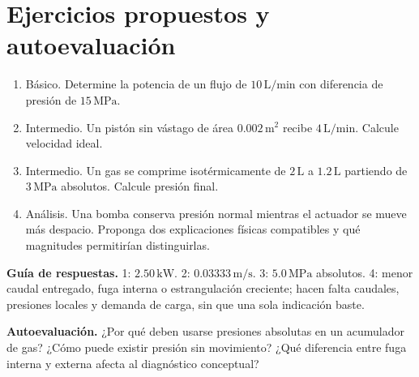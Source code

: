 \section{Ejercicios propuestos y autoevaluación}
\begin{enumerate}
\item Básico. Determine la potencia de un flujo de $10\,\mathrm{L/min}$ con diferencia de presión de $15\,\mathrm{MPa}$.
\item Intermedio. Un pistón sin vástago de área $0.002\,\mathrm{m^2}$ recibe $4\,\mathrm{L/min}$. Calcule velocidad ideal.
\item Intermedio. Un gas se comprime isotérmicamente de $2\,\mathrm{L}$ a $1.2\,\mathrm{L}$ partiendo de $3\,\mathrm{MPa}$ absolutos. Calcule presión final.
\item Análisis. Una bomba conserva presión normal mientras el actuador se mueve más despacio. Proponga dos explicaciones físicas compatibles y qué magnitudes permitirían distinguirlas.
\end{enumerate}
\textbf{Guía de respuestas.} 1: $2.50\,\mathrm{kW}$. 2: $0.03333\,\mathrm{m/s}$. 3: $5.0\,\mathrm{MPa}$ absolutos. 4: menor caudal entregado, fuga interna o estrangulación creciente; hacen falta caudales, presiones locales y demanda de carga, sin que una sola indicación baste.

\textbf{Autoevaluación.} ¿Por qué deben usarse presiones absolutas en un acumulador de gas? ¿Cómo puede existir presión sin movimiento? ¿Qué diferencia entre fuga interna y externa afecta al diagnóstico conceptual?


\studiumchaptercheck

